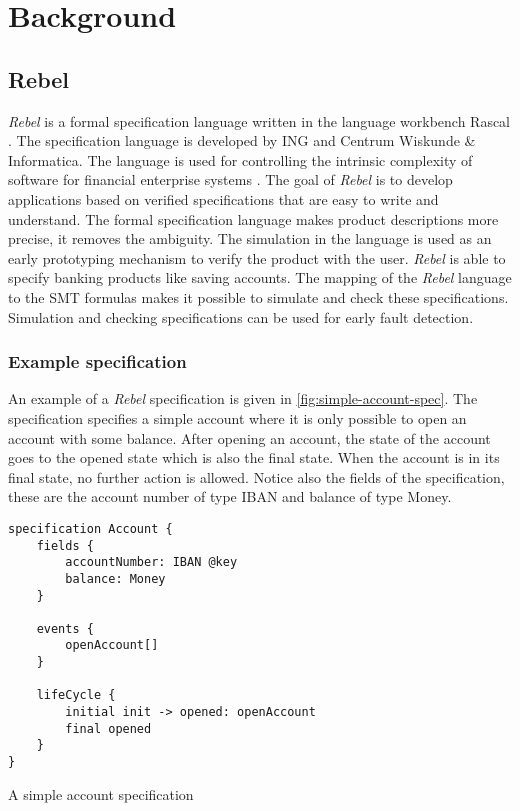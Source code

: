 \chapter{Background}

\section{Rebel}

\textit{Rebel} is a formal specification language written in the language workbench Rascal \cite{RascalGTTSE}. The specification language is developed by ING and Centrum Wiskunde \& Informatica. The language is used for controlling the intrinsic complexity of software for financial enterprise systems \cite[p.1]{stoel_storm_vinju_bosman_2016}. The goal of \textit{Rebel} is to develop applications based on verified specifications that are easy to write and understand.
The formal specification language makes product descriptions more precise, it removes the ambiguity. The simulation in the language is used as an early prototyping mechanism to verify the product with the user.
\textit{Rebel} is able to specify banking products like saving accounts. The mapping of the \textit{Rebel} language to the SMT formulas makes it possible to simulate and check these specifications. Simulation and checking specifications can be used for early fault detection.

\subsection{Example specification}
An example of a \textit{Rebel} specification is given in \autoref{fig:simple-account-spec}. The specification specifies a simple account where it is only possible to open an account with some balance. After opening an account, the state of the account goes to the opened state which is also the final state. When the account is in its final state, no further action is allowed. Notice also the fields of the specification, these are the account number of type IBAN and balance of type Money.

\begin{sourcecode}[h]
\begin{lstlisting}[]
specification Account {
	fields {
		accountNumber: IBAN @key
		balance: Money
	}

	events {
		openAccount[]
	}

	lifeCycle {
		initial init -> opened: openAccount
		final opened
	}
}
\end{lstlisting}
\caption{A simple account specification}
\label{fig:simple-account-spec}
\end{sourcecode}

